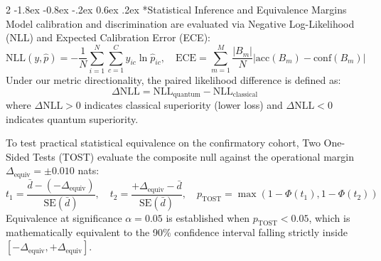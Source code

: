 \documentclass[10pt,a4paper,twoside]{article}
\makeatletter
\renewcommand{\subsection}{\@startsection{subsection}{2}{\z@}%
  {-1.8ex \@plus -0.8ex \@minus -.2ex}%
  {0.6ex \@plus.2ex}%
  {\normalfont\normalsize\sffamily\bfseries\color{naturedark}}}
\makeatother
\begin{document}
\begin{multicols}{2}
\subsection*{Statistical Inference and Equivalence Margins}
Model calibration and discrimination are evaluated via Negative Log-Likelihood (NLL) and Expected Calibration Error (ECE):
\begin{equation}
\text{NLL}(y, \hat{p}) = -\frac{1}{N} \sum_{i=1}^N \sum_{c=1}^C y_{ic} \ln \hat{p}_{ic}, \quad \text{ECE} = \sum_{m=1}^M \frac{|B_m|}{N} |\text{acc}(B_m) - \text{conf}(B_m)|
\end{equation}
Under our metric directionality, the paired likelihood difference is defined as:
\begin{equation}
\Delta\text{NLL} = \text{NLL}_{\text{quantum}} - \text{NLL}_{\text{classical}}
\end{equation}
where $\Delta\text{NLL} > 0$ indicates classical superiority (lower loss) and $\Delta\text{NLL} < 0$ indicates quantum superiority.

To test practical statistical equivalence on the confirmatory cohort, Two One-Sided Tests (TOST) \cite{schuirmann1987,lakens2017} evaluate the composite null against the operational margin $\Delta_{\text{equiv}} = \pm 0.010$ nats:
\begin{equation}
t_1 = \frac{\bar{d} - (-\Delta_{\text{equiv}})}{\text{SE}(\bar{d})}, \quad t_2 = \frac{+\Delta_{\text{equiv}} - \bar{d}}{\text{SE}(\bar{d})}, \quad p_{\text{TOST}} = \max\left(1 - \Phi(t_1), 1 - \Phi(t_2)\right)
\end{equation}
Equivalence at significance $\alpha = 0.05$ is established when $p_{\text{TOST}} < 0.05$, which is mathematically equivalent to the 90\% confidence interval falling strictly inside $[-\Delta_{\text{equiv}}, +\Delta_{\text{equiv}}]$.


\end{multicols}
\end{document}
